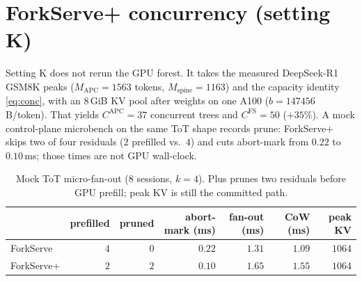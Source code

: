 \documentclass[11pt,a4paper]{article}
\begin{document}
\section{ForkServe+ concurrency (setting K)}

Setting K does not rerun the GPU forest.
It takes the measured DeepSeek-R1 GSM8K peaks ($M_{\mathrm{APC}}{=}1563$ tokens, $M_{\mathrm{spine}}{=}1163$) and the capacity identity \eqref{eq:conc}, with an $8$\,GiB KV pool after weights on one A100 ($b{=}147456$\,B/token).
That yields $C^{\mathrm{APC}}{=}37$ concurrent trees and $C^{\mathrm{FS}}{=}50$ ($+35\%$).
A mock control-plane microbench on the same ToT shape records prune: ForkServe+ skips two of four residuals ($2$ prefilled vs.\ $4$) and cuts abort-mark from $0.22$ to $0.10$\,ms; those times are not GPU wall-clock.

\begin{table}[h]
\centering
\small
\begin{tabular}{@{}lrrrrrr@{}}
\toprule
 & prefilled & pruned & abort-mark (ms) & fan-out (ms) & CoW (ms) & peak KV \\
\midrule
ForkServe & $4$ & $0$ & $0.22$ & $1.31$ & $1.09$ & $1064$ \\
ForkServe+ & $2$ & $2$ & $0.10$ & $1.65$ & $1.55$ & $1064$ \\
\bottomrule
\end{tabular}
\caption{Mock ToT micro-fan-out ($8$ sessions, $k{=}4$).
Plus prunes two residuals before GPU prefill; peak KV is still the committed path.}
\end{table}

\begin{table}[h]
\centering
\small
{}
\caption{Analytical QPS sweep from \eqref{eq:conc} with GSM8K peaks $1563$ vs.\ $1163$.
APC saturates at $37$ slots / $23680$ tok/s; ForkServe+ at $50$ / $32000$ tok/s ($+35\%$).
Max QPS with P99 TTFT $\le 1\,\mathrm{s}$ is $192$ (APC) vs.\ $256$ (ForkServe+).}
\end{table}
\end{document}
